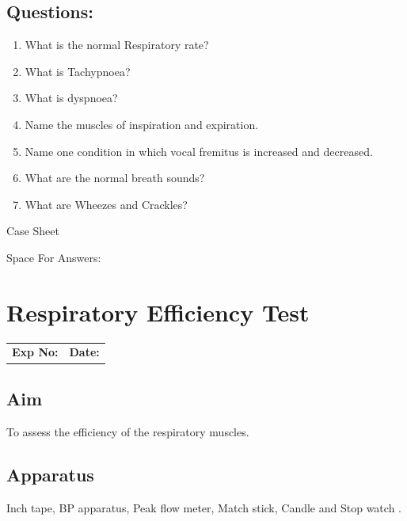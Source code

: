 \documentclass[a4paper,12pt,openany,twoside]{book}
\newcommand{\blankpageForCaseSheet}{
	\newpage
	\thispagestyle{plain}
	\begin{center}
		\huge Case Sheet 
	\end{center}
	\newpage
	\thispagestyle{plain}
	\mbox{}
	}
\newcommand{\blankpageForAnswers}{
	\newpage
	\thispagestyle{plain}
	\begin{center}
		\Large Space For Answers: 
	\end{center}
	}
\begin{document}
\section*{Questions:}
\begin{enumerate}
\item{What is the normal Respiratory rate?}
\item{What is Tachypnoea?}
\item{What is dyspnoea?}
\item{Name the muscles of inspiration and expiration.}
\item{Name one condition in which vocal fremitus is increased and decreased.}
\item{What are the normal breath sounds?}
\item{What are Wheezes and Crackles?}
\end{enumerate}

\blankpageForCaseSheet
\blankpageForAnswers

															\chapter*{\centering Respiratory Efficiency Test}

															\begin{tabular}{p{4.5in} p{1in}}
																\textbf{Exp No:}  & \textbf{Date:}\\
															\end{tabular}
															\section*{Aim}
															To assess the efficiency of the respiratory muscles.
															\section*{Apparatus}
															Inch tape, BP apparatus, Peak flow meter, Match stick, Candle and Stop watch .
\end{document}
